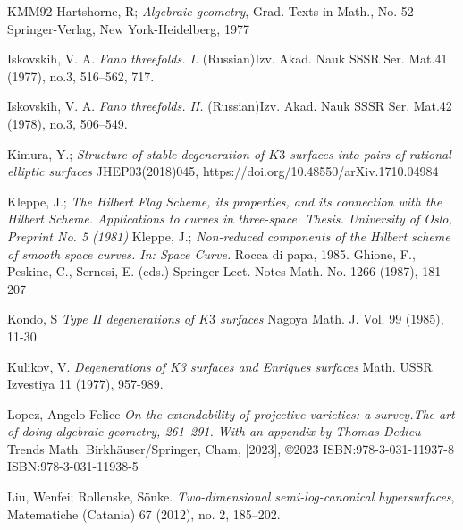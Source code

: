 \documentclass[11pt,twoside]{amsart}
\theoremstyle{plain}
\numberwithin{equation}{section}
\theoremstyle{definition}
\begin{document}
\begin{thebibliography}{KMM92}
Hartshorne, R; \emph{Algebraic geometry}, 
Grad. Texts in Math., No. 52
Springer-Verlag, New York-Heidelberg, 1977

\color{black}
  




Iskovskih, V. A.
\emph{Fano threefolds. I.}
(Russian)Izv. Akad. Nauk SSSR Ser. Mat.41 (1977), no.3, 516–562, 717.

Iskovskih, V. A.
\emph{Fano threefolds. II.}
(Russian)Izv. Akad. Nauk SSSR Ser. Mat.42 (1978), no.3, 506–549.



Kimura, Y.;
\emph{Structure of stable degeneration of $K3$ surfaces into pairs of rational elliptic surfaces}
JHEP03(2018)045, https://doi.org/10.48550/arXiv.1710.04984

Kleppe, J.; 
\emph{The Hilbert Flag Scheme, its properties, and its connection with the Hilbert Scheme. Applications to curves in three-space. Thesis. University of Oslo, Preprint No. 5 (1981)}
Kleppe, J.;
\emph{Non-reduced components of the Hilbert scheme of smooth space curves. In: Space Curve.}
Rocca di papa, 1985. Ghione, F., Peskine, C., Sernesi, E. (eds.) Springer Lect. Notes Math. No. 1266 (1987), 181-207



  




Kondo, S
\emph{Type II degenerations of $K3$ surfaces}
Nagoya Math. J. Vol. 99 (1985), 11-30



Kulikov, V. 
\emph{Degenerations of K3 surfaces and Enriques surfaces} Math. USSR Izvestiya 11 (1977), 957-989.





\color{black}



Lopez, Angelo Felice
\emph{On the extendability of projective varieties: a survey.The art of doing algebraic geometry, 261–291. With an appendix by Thomas Dedieu}
Trends Math. Birkhäuser/Springer, Cham, [2023], ©2023 ISBN:978-3-031-11937-8
ISBN:978-3-031-11938-5


Liu, Wenfei; Rollenske, Sönke. \emph{Two-dimensional semi-log-canonical hypersurfaces}, 
Matematiche (Catania) 67 (2012), no. 2, 185–202.


\end{thebibliography}
\end{document}
